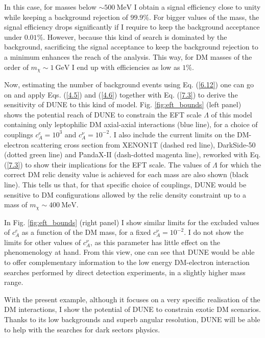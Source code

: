 In this case, for masses below $\sim 500 \ \mathrm{MeV}$ I obtain a signal efficiency close to unity while keeping a background rejection of $99.9\%$. For bigger values of the mass, the signal efficiency drops significantly if I require to keep the background acceptance under $0.01\%$. However, because this kind of search is dominated by the background, sacrificing the signal acceptance to keep the background rejection to a minimum enhances the reach of the analysis. This way, for DM masses of the order of $m_{\chi} \sim 1 \ \mathrm{GeV}$ I end up with efficiencies as low as $1\%$.

Now, estimating the number of background events using Eq. (\ref{6.12}) one can go on and apply Eqs. (\ref{4.5}) and (\ref{4.6}) together with Eq. (\ref{7.3}) to derive the sensitivity of DUNE to this kind of model. Fig. \ref{fig:eft_bounds} (left panel) shows the potential reach of DUNE to constrain the EFT scale $\Lambda$ of this model containing only leptophilic DM axial-axial interactions (blue line), for a choice of couplings $c_{A}^{e} = 10^{3}$ and $c_{A}^{\nu} = 10^{-2}$. I also include the current limits on the DM-electron scattering cross section from XENON1T \cite{XENON2019} (dashed red line), DarkSide-50 \cite{DarkSide2022} (dotted green line) and PandaX-II \cite{PandaX-II2021} (dash-dotted magenta line), reworked with Eq. (\ref{7.3}) to show their implications for the EFT scale. The values of $\Lambda$ for which the correct DM relic density value is achieved for each mass are also shown (black line). This tells us that, for that specific choice of couplings, DUNE would be sensitive to DM configurations allowed by the relic density constraint up to a mass of $m_{\chi} \sim 400 \ \mathrm{MeV}$.

In Fig. \ref{fig:eft_bounds} (right panel) I show similar limits for the excluded values of $c_{A}^{e}$ as a function of the DM mass, for a fixed $c_{A}^{\nu}=10^{-2}$. I do not show the limits for other values of $c_{A}^{\nu}$, as this parameter has little effect on the phenomenology at hand. From this view, one can see that DUNE would be able to offer complementary information to the low energy DM-electron interaction searches performed by direct detection experiments, in a slightly higher mass range.

With the present example, although it focuses on a very specific realisation of the DM interactions, I show the potential of DUNE to constrain exotic DM scenarios. Thanks to its low backgrounds and superb angular resolution, DUNE will be able to help with the searches for dark sectors physics.

